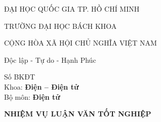 \pagebreak

\thispagestyle{empty}
\begin{minipage}{0.5\textwidth}
\raggedleft
\begin{center}
ĐẠI HỌC QUỐC GIA TP. HỒ CHÍ MINH

TRƯỜNG ĐẠI HỌC BÁCH KHOA
\end{center}
\end{minipage}
\hfill
\begin{minipage}{0.6\textwidth}
\raggedright
\begin{center}
CỘNG HÒA XÃ HỘI CHỦ NGHĨA VIỆT NAM

Độc lập - Tự do - Hạnh Phúc
\end{center}
\end{minipage}

\bigskip
\begin{minipage}{0.5\textwidth}
\begin{center}
Số \underline{\hspace{1cm}} BKĐT\\
Khoa: \textbf{Điện -- Điện tử}\\
Bộ môn: \textbf{Điện tử}
\end{center}
\end{minipage}

\bigskip
\bigskip
\bigskip
\begin{minipage}{0.5\textwidth}
\begin{center}
\fontsize{19}{1}\selectfont \textbf{NHIỆM VỤ LUẬN VĂN TỐT NGHIỆP}
\end{center}
\end{minipage}

